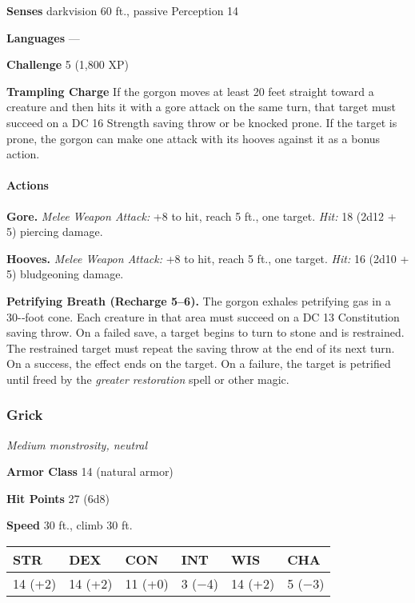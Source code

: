 \documentclass[
]{article}
\begin{document}
\textbf{Senses} darkvision 60 ft., passive Perception 14

\textbf{Languages} ---

\textbf{Challenge} 5 (1,800 XP)

\textbf{Trampling Charge} If the gorgon moves at least 20 feet straight
toward a creature and then hits it with a gore attack on the same turn,
that target must succeed on a DC 16 Strength saving throw or be knocked
prone. If the target is prone, the gorgon can make one attack with its
hooves against it as a bonus action.

\hypertarget{actions-20}{%
\paragraph{Actions}\label{actions-20}}

\textbf{Gore.} \emph{Melee Weapon Attack:} +8 to hit, reach 5 ft., one
target. \emph{Hit:} 18 (2d12 + 5) piercing damage.

\textbf{Hooves.} \emph{Melee Weapon Attack:} +8 to hit, reach 5 ft., one
target. \emph{Hit:} 16 (2d10 + 5) bludgeoning damage.

\textbf{Petrifying Breath (Recharge 5--6).} The gorgon exhales
petrifying gas in a 30-­‐foot cone. Each creature in that area must
succeed on a DC 13 Constitution saving throw. On a failed save, a target
begins to turn to stone and is restrained. The restrained target must
repeat the saving throw at the end of its next turn. On a success, the
effect ends on the target. On a failure, the target is petrified until
freed by the \emph{greater restoration} spell or other magic.

\hypertarget{grick}{%
\subsubsection{Grick}\label{grick}}

\emph{Medium monstrosity, neutral}

\textbf{Armor Class} 14 (natural armor)

\textbf{Hit Points} 27 (6d8)

\textbf{Speed} 30 ft., climb 30 ft.

\begin{longtable}[]{@{}llllll@{}}
\toprule
STR & DEX & CON & INT & WIS & CHA\tabularnewline
\midrule
\endhead
14 (+2) & 14 (+2) & 11 (+0) & 3 (−4) & 14 (+2) & 5 (−3)\tabularnewline
\bottomrule
\end{longtable}
\end{document}
